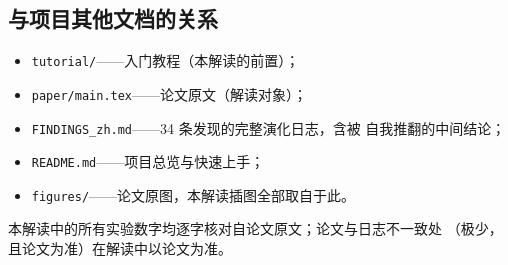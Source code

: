 \subsection{与项目其他文档的关系}

\begin{itemize}
  \item \texttt{tutorial/}——入门教程（本解读的前置）；
  \item \texttt{paper/main.tex}——论文原文（解读对象）；
  \item \texttt{FINDINGS\_zh.md}——34 条发现的完整演化日志，含被
        自我推翻的中间结论；
  \item \texttt{README.md}——项目总览与快速上手；
  \item \texttt{figures/}——论文原图，本解读插图全部取自于此。
\end{itemize}

本解读中的所有实验数字均逐字核对自论文原文；论文与日志不一致处
（极少，且论文为准）在解读中以论文为准。
